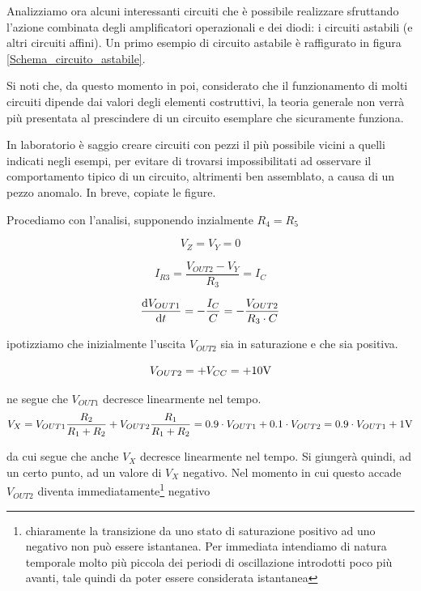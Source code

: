 \documentclass{article}
\begin{document}
Analizziamo ora alcuni interessanti circuiti che è possibile realizzare sfruttando l'azione combinata degli amplificatori operazionali e dei diodi: i circuiti astabili (e altri circuiti affini). Un primo esempio di circuito astabile è raffigurato in figura \ref{Schema_circuito_astabile}. 

\vspace{3mm}

Si noti che, da questo momento in poi, considerato che il funzionamento di molti circuiti dipende dai valori degli elementi costruttivi, la teoria generale non verrà più presentata al prescindere di un circuito esemplare che sicuramente funziona. 

\vspace{1mm}

In laboratorio è saggio creare circuiti con pezzi il più possibile vicini a quelli indicati negli esempi, per evitare di trovarsi impossibilitati ad osservare il comportamento tipico di un circuito, altrimenti ben assemblato, a causa di un pezzo anomalo. In breve, copiate le figure.

\vspace{3mm}

Procediamo con l'analisi, supponendo inzialmente $R_4 = R_5$

\[V_Z = V_Y =0\] 

\[I_{R3} = \frac{V_{OUT2} - V_Y}{R_3} = I_C\]

\[\frac{\textrm d V_{OUT1}}{\textrm d t} = -\frac{I_C}{C} = -\frac{V_{OUT2}}{R_3 \cdot C}\]

ipotizziamo che inizialmente l'uscita $V_{OUT2}$ sia in saturazione e che sia positiva.

\[V_{OUT2} = + V_{CC} = + 10 \textrm V\]

ne segue che $V_{OUT1}$ decresce linearmente nel tempo.
\[V_X = V_{OUT1} \frac{R_2}{R_1 + R_2} + V_{OUT2} \frac{R_1}{R_1 + R_2} = 0.9 \cdot V_{OUT1} + 0.1 \cdot V_{OUT2} = 0.9 \cdot V_{OUT1} + 1 \textrm V\]

da cui segue che anche $V_X$ decresce linearmente nel tempo. Si giungerà quindi, ad un certo punto, ad un valore di $V_X$ negativo. Nel momento in cui questo accade $V_{OUT2}$ diventa immediatamente\footnote{chiaramente la transizione da uno stato di saturazione positivo ad uno negativo non può essere istantanea. Per immediata intendiamo di natura temporale molto più piccola dei periodi di oscillazione introdotti poco più avanti, tale quindi da poter essere considerata istantanea} negativo
\end{document}
